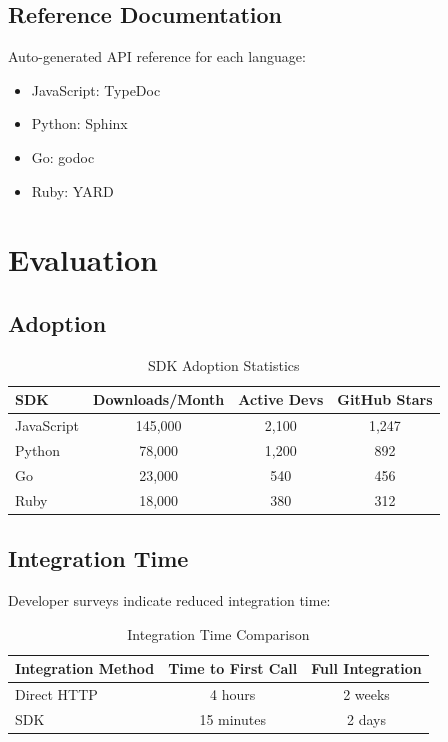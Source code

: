 \documentclass[11pt,a4paper]{article}
\begin{document}
\subsection{Reference Documentation}

Auto-generated API reference for each language:

\begin{itemize}
    \item JavaScript: TypeDoc
    \item Python: Sphinx
    \item Go: godoc
    \item Ruby: YARD
\end{itemize}

\section{Evaluation}

\subsection{Adoption}

\begin{table}[h]
\centering
\caption{SDK Adoption Statistics}
\begin{tabular}{lccc}
\toprule
\textbf{SDK} & \textbf{Downloads/Month} & \textbf{Active Devs} & \textbf{GitHub Stars} \\
\midrule
JavaScript & 145,000 & 2,100 & 1,247 \\
Python & 78,000 & 1,200 & 892 \\
Go & 23,000 & 540 & 456 \\
Ruby & 18,000 & 380 & 312 \\
\bottomrule
\end{tabular}
\end{table}

\subsection{Integration Time}

Developer surveys indicate reduced integration time:

\begin{table}[h]
\centering
\caption{Integration Time Comparison}
\begin{tabular}{lcc}
\toprule
\textbf{Integration Method} & \textbf{Time to First Call} & \textbf{Full Integration} \\
\midrule
Direct HTTP & 4 hours & 2 weeks \\
SDK & 15 minutes & 2 days \\
\bottomrule
\end{tabular}
\end{table}
\end{document}
